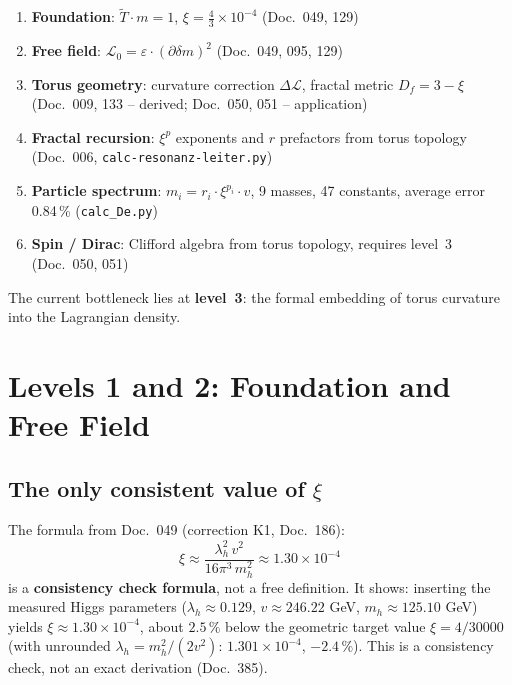 \begin{enumerate}
    \item \textbf{Foundation}: $\tilde{T} \cdot m = 1$,
          $\xi = \frac{4}{3} \times 10^{-4}$ (Doc.~049, 129)
    \item \textbf{Free field}: $\mathcal{L}_0 = \varepsilon \cdot
          (\partial\delta m)^2$ (Doc.~049, 095, 129)
    \item \textbf{Torus geometry}: curvature correction $\Delta\mathcal{L}$,
          fractal metric $D_f = 3 - \xi$ (Doc.~009, 133 -- derived; Doc.~050, 051 -- application)
    \item \textbf{Fractal recursion}: $\xi^p$ exponents and
          $r$ prefactors from torus topology (Doc.~006,
          \texttt{calc-resonanz-leiter.py})
    \item \textbf{Particle spectrum}: $m_i = r_i \cdot \xi^{p_i} \cdot v$,
          9 masses, 47 constants, average error 0.84\,\%
          (\texttt{calc\_De.py})
    \item \textbf{Spin / Dirac}: Clifford algebra from torus topology,
          requires level~3 (Doc.~050, 051)
\end{enumerate}

The current bottleneck lies at \textbf{level~3}: the formal embedding
of torus curvature into the Lagrangian density.

\section{Levels 1 and 2: Foundation and Free Field}

\subsection{The only consistent value of \texorpdfstring{$\xi$}{xi}}

The formula from Doc.~049 (correction K1, Doc.~186):
\begin{equation}
    \xi \approx \frac{\lambda_h^2\, v^2}{16\pi^3\, m_h^2}
    \approx 1.30 \times 10^{-4}
    \label{eq:xi_higgs_en}
\end{equation}
is a \textbf{consistency check formula}, not a free definition.
It shows: inserting the measured Higgs parameters
($\lambda_h \approx 0.129$, $v \approx 246.22$ GeV,
$m_h \approx 125.10$ GeV) yields $\xi \approx 1.30 \times 10^{-4}$, about $2.5\,\%$ below the geometric target value $\xi = 4/30000$
(with unrounded $\lambda_h = m_h^2/(2v^2)$: $1.301 \times 10^{-4}$, $-2.4\,\%$).
This is a consistency check, not an exact derivation (Doc.~385).

